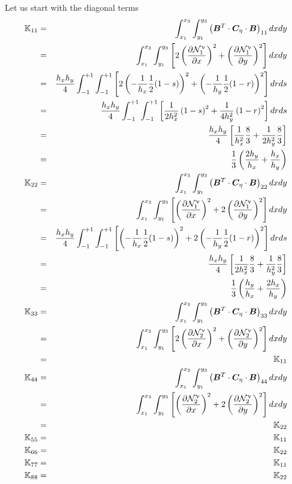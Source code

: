 \newpage
Let us start with the diagonal terms 
\begin{eqnarray}
{\mathbb{K}}_{11} 
&=& \int_{x_1}^{x_3} \int_{y_1}^{y_3} 
\left({\bm B}^T \cdot {\bm C}_\eta \cdot {\bm B}\right)_{11} dx dy \nonumber\\
&=& \int_{x_1}^{x_3} \int_{y_1}^{y_3}
\left[
2 \left( \frac{\partial {\mathcal{N}}_1^\upnu}{\partial x}  \right)^2 + 
\left( \frac{\partial {\mathcal{N}}_1^\upnu}{\partial y} \right)^2
\right] dxdy \nonumber\\
&=& \frac{h_xh_y}{4} \int_{-1}^{+1} \int_{-1}^{+1} 
\left[ 
2 \left( -\frac{1}{h_x}\frac12 (1-s) \right)^2
+ \left( -\frac{1}{h_y}\frac12 (1-r) \right)^2
\right] drds \nonumber\\
&=& \frac{h_xh_y}{4} \int_{-1}^{+1} \int_{-1}^{+1} 
\left[ 
 \frac{1}{2h_x^2} \left( 1-s \right)^2
+ \frac{1}{4h_y^2} \left( 1-r \right)^2
\right] drds \nonumber\\
&=& \frac{h_xh_y}{4} \left[ \frac{1}{h_x^2} \frac83 + 
\frac{1}{2h_y^2} \frac83 \right] \nonumber\\
&=& \frac{1}{3} \left( \frac{2h_y}{h_x} + \frac{h_x}{h_y} \right) 
\nonumber\\
{\mathbb{K}}_{22} 
&=& \int_{x_1}^{x_3} \int_{y_1}^{y_3} 
\left({\bm B}^T \cdot {\bm C}_\eta \cdot {\bm B}\right)_{22} dx dy \nonumber\\
&=& \int_{x_1}^{x_3} \int_{y_1}^{y_3}
\left[
\left( \frac{\partial {\mathcal{N}}_1^\upnu}{\partial x}  \right)^2 + 
2\left( \frac{\partial {\mathcal{N}}_1^\upnu}{\partial y} \right)^2
\right] dxdy \nonumber\\
&=& \frac{h_xh_y}{4} \int_{-1}^{+1} \int_{-1}^{+1} 
\left[ 
 \left( -\frac{1}{h_x}\frac12 (1-s) \right)^2
+2 \left( -\frac{1}{h_y}\frac12 (1-r) \right)^2
\right] drds \nonumber\\
&=& \frac{h_xh_y}{4} \left[ \frac{1}{2h_x^2} \frac83 + 
\frac{1}{h_y^2} \frac83 \right] \nonumber\\
&=& \frac{1}{3} \left( \frac{h_y}{h_x} + \frac{2h_x}{h_y} \right) \nonumber\\
{\mathbb{K}}_{33} 
&=& \int_{x_1}^{x_3} \int_{y_1}^{y_3} 
\left({\bm B}^T \cdot {\bm C}_\eta \cdot {\bm B}\right)_{33} dx dy \nonumber\\
&=& \int_{x_1}^{x_3} \int_{y_1}^{y_3}
\left[
2 \left( \frac{\partial {\mathcal{N}}_2^\upnu}{\partial x}  \right)^2 + 
\left( \frac{\partial {\mathcal{N}}_2^\upnu}{\partial y} \right)^2
\right] dxdy \nonumber\\
&=& {\mathbb{K}}_{11} \nonumber\\
{\mathbb{K}}_{44} 
&=& \int_{x_1}^{x_3} \int_{y_1}^{y_3} 
\left({\bm B}^T \cdot {\bm C}_\eta \cdot {\bm B}\right)_{44} dx dy \nonumber\\
&=& \int_{x_1}^{x_3} \int_{y_1}^{y_3}
\left[
 \left( \frac{\partial {\mathcal{N}}_2^\upnu}{\partial x}  \right)^2 + 
2\left( \frac{\partial {\mathcal{N}}_2^\upnu}{\partial y} \right)^2
\right] dxdy \nonumber\\
&=& {\mathbb{K}}_{22} \nonumber\\
{\mathbb{K}}_{55} &=& {\mathbb{K}}_{11} \nonumber\\
{\mathbb{K}}_{66} &=& {\mathbb{K}}_{22} \nonumber\\
{\mathbb{K}}_{77} &=& {\mathbb{K}}_{11} \nonumber\\
{\mathbb{K}}_{88} &=& {\mathbb{K}}_{22} \nonumber
\end{eqnarray}


